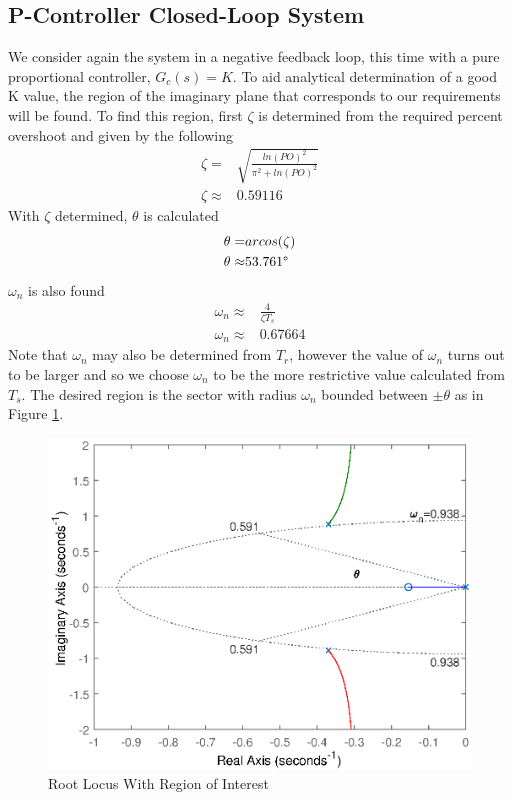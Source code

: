 \documentclass{article}
\begin{document}
    \subsection{P-Controller Closed-Loop System}
    We consider again the system in a negative feedback loop, this time with a pure proportional controller, \(G_c(s) = K\). 
    To aid analytical determination of a good K value, the region of the imaginary plane that corresponds to our requirements will be found.
    To find this region, first \(\zeta\) is determined from the required percent overshoot and given by the following
    \begin{equation}
        \begin{aligned}
            \zeta=&\sqrt{\frac{ln(PO)^2}{\pi^2+ln(PO)^2}}\\
            \zeta\approx& 0.59116
        \end{aligned}
    \end{equation}
    With $\zeta$ determined, $\theta$ is calculated
    \begin{equation}
        \begin{aligned}
            \theta=& arcos(\zeta)\\
            \theta\approx& 53.761\degree
        \end{aligned}
    \end{equation}
    $\omega_n$ is also found
    \begin{equation}
        \begin{aligned}
            \omega_n\approx& \frac{4}{\zeta T_s}\\
            \omega_n\approx& 0.67664
        \end{aligned}
    \end{equation}
    Note that \(\omega_n\) may also be determined from $T_r$, however the value of \(\omega_n\) turns out to be larger and so we choose \(\omega_n\) to be the more restrictive value calculated from $T_s$.
    The desired region is the sector with radius $\omega_n$ bounded between $\pm\theta$ as in Figure \ref{fig:PRLocus}.
    \begin{figure}[ht]
        \includegraphics[scale=.5]{PRLocus.eps}
        \caption{Root Locus With Region of Interest}
        \label{fig:PRLocus}
    \end{figure}
\end{document}
